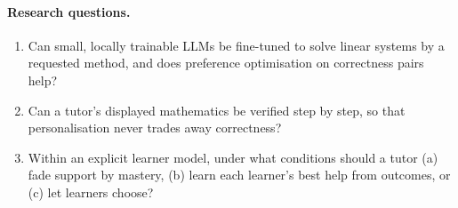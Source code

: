\documentclass[11pt,a4paper]{article}
\begin{document}
\paragraph{Research questions.}
\begin{enumerate}[label=\textbf{RQ\arabic*}]
  \item Can small, locally trainable LLMs be fine-tuned to solve linear systems by a
        requested method, and does preference optimisation on correctness pairs help?
  \item Can a tutor's displayed mathematics be verified step by step, so that
        personalisation never trades away correctness?
  \item Within an explicit learner model, under what conditions should a tutor (a) fade
        support by mastery, (b) learn each learner's best help from outcomes, or (c) let
        learners choose?
\end{enumerate}
\end{document}
